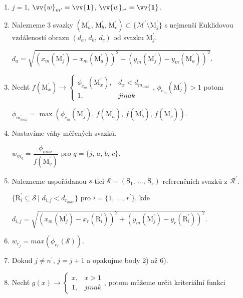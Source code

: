 \begin{enumerate}
\item $j = 1$, $\vv{w}_{m^\prime} = \vv{\mathbf{1}}$, $\vv{w}_{r^\prime} = \vv{\mathbf{1}}$. 

\item Nalezneme 3 svazky $\left(\mathrm{M}^\prime_a,\,\mathrm{M}^\prime_b,\,\mathrm{M}^\prime_c \right) \subset \lbrace \mathcal{M}^\prime\setminus \mathrm{M}^\prime_j\rbrace$ s nejmenší Euklidovou vzdáleností obrazu $\left(d_a,\,d_b,\,d_c\right)$ od svazku $\mathrm{M}^\prime_j$.

$d_a = \sqrt{\left( x_{m}(\mathrm{M}_j^\prime) -  x_{m}(\mathrm{M}_a^\prime) \right)^2 + \left( y_{m}(\mathrm{M}_j^\prime) -  y_{m}(\mathrm{M}_a^\prime) \right)^2}$.

\item Nechť $f(\mathrm{M}^\prime_x)\rightarrow \begin{cases}
\phi_{e_{m}}\left(\mathrm{M}^\prime_x \right), & d_x < d_{m_{max}}\\
1, & jinak
\end{cases}$, $\phi_{e_{m}}(\mathrm{M}^\prime_j) > 1 $ potom 

$\phi_{m^\prime_{max}} = \max\left(\phi_{e_{m}}(\mathrm{M}^\prime_j),\,f(\mathrm{M}^\prime_a),\,f(\mathrm{M}^\prime_b),\,f(\mathrm{M}^\prime_c)  \right)$. 

\item Nastavíme váhy měřených svazků.

 $w_{m^\prime_{q}} = \dfrac{\phi_{max}}{f(\mathrm{M}^\prime_q)}$ pro $q = \lbrace j,\,a,\,b,\,c \rbrace$.
 
\item Nalezneme uspořádanou $s$-tici $\mathcal{S} = (\mathrm{S}_1,\,\dots,\,\mathrm{S}_s)$ referenčních svazků z $\mathcal{R}^\prime$. 

$\lbrace \mathrm{R}^\prime_i \subseteq \mathcal{S}\,|\,\, d_{i,j} < d_{r_{max}}  \rbrace$ pro $i = \lbrace 1,\,\dots,\, r^\prime \rbrace$, kde 

$d_{i,j} = \sqrt{\left( x_{m}(\mathrm{M}_j^\prime) -  x_{r}(\mathrm{R}_i^\prime) \right)^2 + \left( y_{m}(\mathrm{M}_j^\prime) -  y_{r}(\mathrm{R}_i^\prime) \right)^2}$.

\item $w_{r^\prime_j} = max\left( \phi_{e_r}(\mathcal{S}) \right)$.

\item Dokud $j \neq n^\prime$, $j = j+1$ a opakujme body 2) až 6). 

\item Nechť  $g(x)\rightarrow \begin{cases}
x, & x > 1\\
1, & jinak
\end{cases}$, potom můžeme určit kriteriální funkci 


\end{enumerate}
